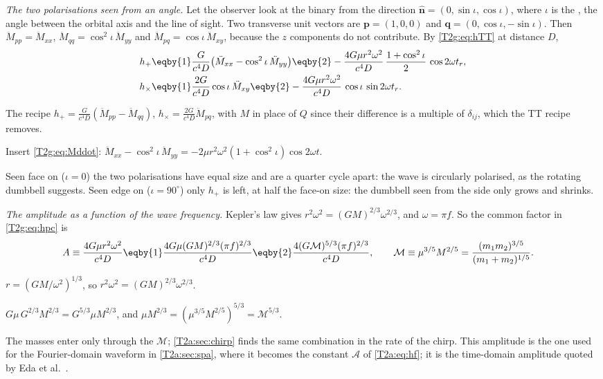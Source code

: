 \emph{The two polarisations seen from an angle.} Let the observer look at the binary from the direction $\hat{\bm n}=(0,\sin\iota,\cos\iota)$, where $\iota$ is the , the angle between the orbital axis and the line of sight. Two transverse unit vectors are $\bm p=(1,0,0)$ and $\bm q=(0,\cos\iota,-\sin\iota)$. Then $\ddot M_{pp}=\ddot M_{xx}$, $\ddot M_{qq}=\cos^2\iota\,\ddot M_{yy}$ and $\ddot M_{pq}=\cos\iota\,\ddot M_{xy}$, because the $z$ components do not contribute. By \eqref{T2g:eq:hTT} at distance $D$,
\begin{align}
  h_+&\eqby{1}\frac{G}{c^4D}\big(\ddot M_{xx}-\cos^2\iota\,\ddot M_{yy}\big)
  \eqby{2}-\frac{4G\mu r^2\omega^2}{c^4D}\,\frac{1+\cos^2\iota}{2}\,\cos2\omega t_r,\nonumber\\
  h_\times&\eqby{1}\frac{2G}{c^4D}\cos\iota\,\ddot M_{xy}
  \eqby{2}-\frac{4G\mu r^2\omega^2}{c^4D}\,\cos\iota\,\sin2\omega t_r .
  \label{T2g:eq:hpc}
\end{align}
\begin{explain}
  \item The recipe $h_+=\frac{G}{c^4D}(\ddot M_{pp}-\ddot M_{qq})$, $h_\times=\frac{2G}{c^4D}\ddot M_{pq}$, with $M$ in place of $Q$ since their difference is a multiple of $\delta_{ij}$, which the TT recipe removes.
  \item Insert \eqref{T2g:eq:Mddot}: $\ddot M_{xx}-\cos^2\iota\,\ddot M_{yy}=-2\mu r^2\omega^2(1+\cos^2\iota)\cos2\omega t$.
\end{explain}
Seen face on ($\iota=0$) the two polarisations have equal size and are a quarter cycle apart: the wave is circularly polarised, as the rotating dumbbell suggests. Seen edge on ($\iota=90^\circ$) only $h_+$ is left, at half the face-on size: the dumbbell seen from the side only grows and shrinks.

\emph{The amplitude as a function of the wave frequency.} Kepler's law gives $r^2\omega^2=(GM)^{2/3}\omega^{2/3}$, and $\omega=\pi f$. So the common factor in \eqref{T2g:eq:hpc} is
\begin{align}
  A\equiv\frac{4G\mu r^2\omega^2}{c^4D}
  &\eqby{1}\frac{4G\mu(GM)^{2/3}(\pi f)^{2/3}}{c^4D}
  \eqby{2}\frac{4(G\mathcal M)^{5/3}(\pi f)^{2/3}}{c^4D},
  \qquad \mathcal M\equiv\mu^{3/5}M^{2/5}=\frac{(m_1m_2)^{3/5}}{(m_1+m_2)^{1/5}} .
  \label{T2g:eq:amp}
\end{align}
\begin{explain}
  \item $r=(GM/\omega^2)^{1/3}$, so $r^2\omega^2=(GM)^{2/3}\omega^{2/3}$.
  \item $G\mu\,G^{2/3}M^{2/3}=G^{5/3}\mu M^{2/3}$, and $\mu M^{2/3}=(\mu^{3/5}M^{2/5})^{5/3}=\mathcal M^{5/3}$.
\end{explain}
The masses enter only through the  $\mathcal M$; \cref{T2a:sec:chirp} finds the same combination in the rate of the chirp. This amplitude is the one used for the Fourier-domain waveform in \cref{T2a:sec:spa}, where it becomes the constant $\mathcal A$ of \eqref{T2a:eq:hf}; it is the time-domain amplitude quoted by Eda et al.\ \cite[eq.~(21)]{Eda2015}.

